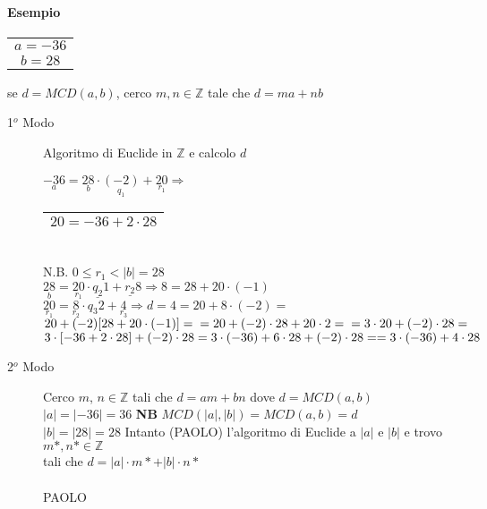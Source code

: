     \paragraph{Esempio} 
    \begin{tabular}{c}
        $a=-36$\\
        $b=28$
    \end{tabular} se $d=MCD(a,b)$, cerco $m,n\in\mathbb{Z}$ tale che $d=ma+nb$
    \begin{description}
        \item[1$^o$ Modo] Algoritmo di Euclide in $\mathbb{Z}$ e calcolo $d$\\
            {\color{orange}
            $\underset{a}{-36}=\underset{b}{28}\cdot\underset{q_1}{(-2)}+\underset{r_1}{20}
            \Rightarrow$
            \begin{tabular}{|c|}
                \hline 
                $20=-36+2\cdot 28$\\
                \hline 
            \end{tabular}
            }\\
            {\color{blue}N.B. $0\leq r_1<|b|=28$ }\\
            {\color{green} 
            $\underset{b}{28}=\underset{r_1}{20}\cdot\underline{q_2}{1}+\underline{r_2}{8}
            \Longrightarrow 8=28+20\cdot (-1)$\\
            }
            {\color{blue} 
            $\underset{r_1}{20}=\underset{r_2}{8}\cdot {q_3}{2}+\underset{r_3}{4} 
            \Longrightarrow d=4=20+8\cdot (-2) = $
            }
            {\color{green}
            $20+(-2)[28+20\cdot (-1)]=
            \\ =20+(-2) \cdot 28 + 20 \cdot 2=\\
            =3\cdot 20 + (-2)\cdot 28 =$\\}
            {\color{orange} $3\cdot [-36 +2\cdot 28] + (-2) \cdot 28 \\
            =3\cdot (-36) +6 \cdot 28 + (-2)\cdot 28= 
            =3\cdot (-36) +4 \cdot 28 $}
            
        \item[2$^o$ Modo] 
            Cerco $m$, $n\in\mathbb{Z}$ tali che $d=am+bn$ dove $d=MCD(a,b)$
            $|a|=|-36|=36$ \hspace{1cm} \textbf{NB} $MCD(|a|,|b|)=MCD(a,b)=d$\\
            $|b|=|28|=28$ 
            Intanto (PAOLO) l'algoritmo di Euclide a $|a|$ e $|b|$ e trovo
            $m*,n*\in\mathbb{Z}$\\
            tali che $d=|a|\cdot m*+|b| \cdot n*$
            \\\\PAOLO\\\\

    \end{description}
